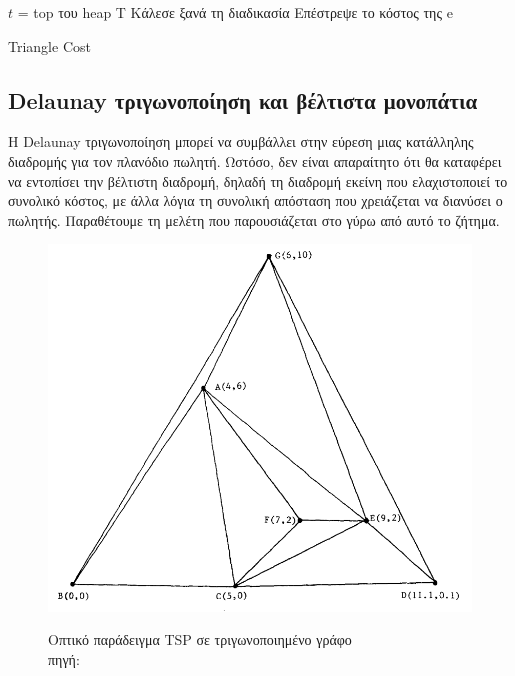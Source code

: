 \documentclass[oneside,12pt]{book}
\newenvironment{matlab}
	{\begin{figure}[hp]\centering\captionsetup{justification=centering}}
	{\end{figure}}
\theoremstyle{definition}
\begin{document}
\begin{algorithm}[H]
	\SetAlgoLined
	
	\(t\) = top του heap T \;
	{Κάλεσε ξανά τη διαδικασία \;}
	Επέστρεψε το κόστος της e \;
	
	\caption{Triangle Cost}
\end{algorithm}

\subsection{Delaunay τριγωνοποίηση και βέλτιστα μονοπάτια}

Η Delaunay τριγωνοποίηση μπορεί να συμβάλλει στην εύρεση μιας κατάλληλης διαδρομής για τον πλανόδιο πωλητή. Ωστόσο, δεν είναι απαραίτητο ότι θα καταφέρει να εντοπίσει την βέλτιστη διαδρομή, δηλαδή τη διαδρομή εκείνη που ελαχιστοποιεί το συνολικό κόστος, με άλλα λόγια τη συνολική απόσταση που χρειάζεται να διανύσει ο πωλητής. Παραθέτουμε τη μελέτη που παρουσιάζεται στο \cite{18} γύρω από αυτό το ζήτημα. \\

\begin{matlab}
	\includegraphics[scale=0.5]{images/delaunay.png}
	\caption{Οπτικό παράδειγμα TSP σε τριγωνοποιημένο γράφο \\ πηγή: \cite{18}}
\end{matlab} 
\end{document}

